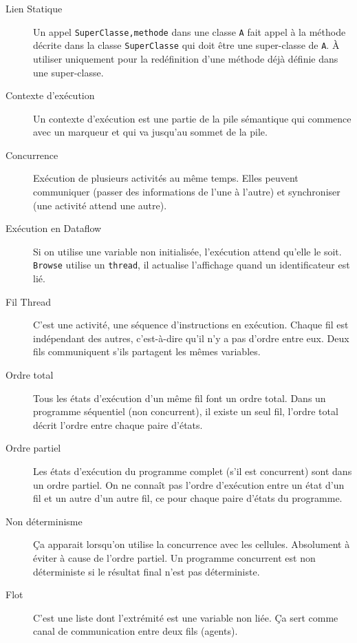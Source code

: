 \begin{description}
  \item[Lien Statique]
    Un appel
    \lstinline|SuperClasse,methode|
    dans une classe \lstinline|A|
    fait appel à la méthode décrite dans la classe \lstinline|SuperClasse|
    qui doit être une super-classe de \lstinline|A|.
    À utiliser uniquement pour la redéfinition d'une méthode
    déjà définie dans une super-classe.

  \item[Contexte d'exécution]
    Un contexte d’exécution est une partie de la pile sémantique
    qui commence avec un marqueur et qui va jusqu’au sommet
    de la pile.

  \item[Concurrence]
    Exécution de plusieurs activités au même temps.
    Elles peuvent communiquer (passer des informations de l'une à l'autre)
    et synchroniser (une activité attend une autre).

  \item[Exécution en Dataflow]
    Si on utilise une variable non initialisée,
    l'exécution attend qu'elle le soit.
    \lstinline|Browse| utilise un \lstinline|thread|,
    il actualise l'affichage quand un identificateur est lié.

  \item[Fil Thread]
    C'est une activité, une séquence d'instructions en exécution.
    Chaque fil est indépendant des autres,
    c'est-à-dire qu'il n'y a pas d'ordre entre eux.
    Deux fils communiquent s'ils partagent les mêmes variables.

  \item[Ordre total]
    Tous les états d'exécution d'un même fil font un ordre total.
    Dans un programme séquentiel (non concurrent), il existe un seul fil,
    l'ordre total décrit l'ordre entre chaque paire d'états.

  \item[Ordre partiel]
    Les états d'exécution du programme complet (s'il est concurrent)
    sont dans un ordre partiel.
    On ne connaît pas l'ordre d'exécution entre un état d'un fil
    et un autre d'un autre fil, ce pour chaque paire d'états du programme.

  \item[Non déterminisme]
    Ça apparait lorsqu'on utilise la concurrence avec les cellules.
    Absolument à éviter à cause de l'ordre partiel.
    Un programme concurrent est non déterministe
    si le résultat final n'est pas déterministe.

  \item[Flot]
    C'est une liste dont l'extrémité est une variable non liée.
    Ça sert comme canal de communication entre deux fils (agents).


\end{description}

